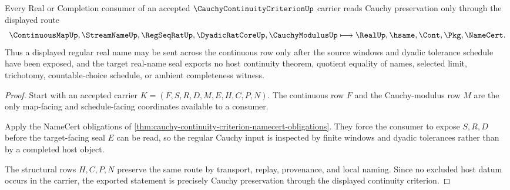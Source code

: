 \begin{theorem}
\label{thm:cauchy-continuity-criterion-cauchy-preservation}
Every Real or Completion consumer of an accepted $\CauchyContinuityCriterionUp$ carrier reads Cauchy preservation only through the displayed route
$$
\ContinuousMapUp,\StreamNameUp,\RegSeqRatUp,\DyadicRatCoreUp,\CauchyModulusUp
\longmapsto
\RealUp,\hsame,\Cont,\Pkg,\NameCert .
$$
Thus a displayed regular real name may be sent across the continuous row only after the source windows and dyadic tolerance schedule have been exposed, and the target real-name seal exports no host continuity theorem, quotient equality of names, selected limit, trichotomy, countable-choice schedule, or ambient completeness witness.
\end{theorem}
\begin{proof}
Start with an accepted carrier $K=(F,S,R,D,M,E,H,C,P,N)$. The continuous row $F$ and the Cauchy-modulus row $M$ are the only map-facing and schedule-facing coordinates available to a consumer.

Apply the NameCert obligations of \autoref{thm:cauchy-continuity-criterion-namecert-obligations}. They force the consumer to expose $S,R,D$ before the target-facing seal $E$ can be read, so the regular Cauchy input is inspected by finite windows and dyadic tolerances rather than by a completed host object.

The structural rows $H,C,P,N$ preserve the same route by transport, replay, provenance, and local naming. Since no excluded host datum occurs in the carrier, the exported statement is precisely Cauchy preservation through the displayed continuity criterion.
\end{proof}


\begin{closurestatus}{\CauchyContinuityCriterionUp}
  \theoryclosure{\seedClosure}
  \formalstatus{\unformalizedV}
\end{closurestatus}
